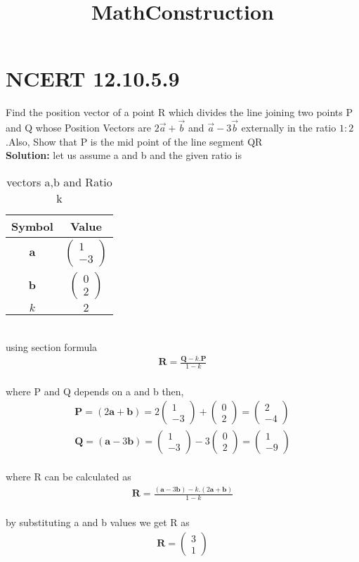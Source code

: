 \documentclass{article}
\title{MathConstruction}
\newcommand{\myvec}[1]{\ensuremath{\begin{pmatrix}#1\end{pmatrix}}}
\let\vec\mathbf
\begin{document}
\section{NCERT 12.10.5.9}

Find the position vector of a point R which divides the line joining two points P and Q whose Position Vectors are $2\overrightarrow{a}+\overrightarrow{b}$ and $\overrightarrow{a}-3\overrightarrow{b}$ externally in the ratio $1:2$.Also, Show that P is the mid point of the line segment QR  \\
\textbf{Solution:}
let us assume a and b and the given ratio is
\begin{table}[h]
    \centering
    \begin{tabular}{|c|c|}
        \hline
        \textbf{Symbol} & \textbf{Value} \\
        \hline
        $\vec{a}$ & $\myvec{1\\-3}$ \\
        \hline
        $\vec{b}$ & $\myvec{0\\2}$ \\
        \hline
        $k$ & $2$ \\
        \hline
    \end{tabular}
    \label{tab:mytable}
    \caption{vectors a,b and Ratio k}
\end{table}\\
using section formula
\begin{align}
    \vec{R}=\frac{\vec{Q}-k.\vec{P}}{1-k}
\end{align}\\
where P and Q depends on a and b then,
\begin{align}
	\vec{P}=(2\vec{a}+\vec{b})=2\myvec{1\\-3}+\myvec{0\\2}=\myvec{2\\-4}\\
    	\vec{Q}=(\vec{a}-3\vec{b})=\myvec{1\\-3}-3\myvec{0\\2}=\myvec{1\\-9}
\end{align}\\
where R can be calculated as 
\begin{align}
	\vec{R}=\frac{(\vec{a}-3\vec{b})-k.(2\vec{a}+\vec{b})}{1-k}
\end{align}\\
by substituting a and b values we get R as
\begin{align}
    \vec{R}=\myvec{3\\1}
\end{align}
\end{document}
